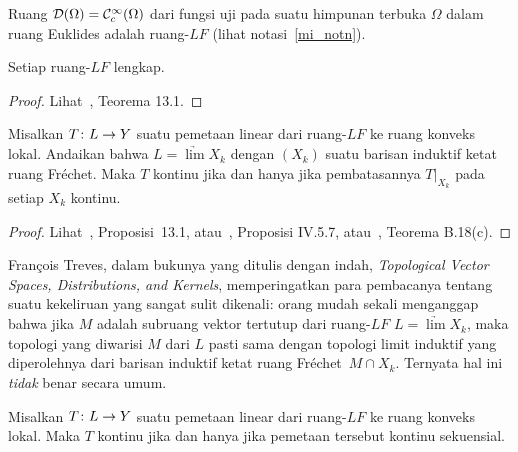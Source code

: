 \begin{exam} Ruang $\mathcal{D}(\Omega) = \mathcal{C}^\infty_c(\Omega)$ dari fungsi uji pada suatu himpunan terbuka $\Omega$ dalam ruang Euklides
adalah ruang-$LF$ (lihat notasi~\ref{mi_notn}).
\end{exam}

\begin{prop} Setiap ruang-$LF$ lengkap.
\end{prop}

\begin{proof} Lihat~\cite{Treves:1967}, Teorema 13.1.  \ns
\end{proof}

\begin{prop} Misalkan $T\colon L \rightarrow Y$ suatu pemetaan linear dari ruang-$LF$ ke ruang konveks lokal. Andaikan bahwa $L = \underrightarrow{\lim}X_k$
dengan $(X_k)$ suatu barisan induktif ketat ruang Fr\'echet. Maka $T$ kontinu jika dan hanya jika pembatasannya $T\bigr|_{X_k}$
pada setiap $X_k$ kontinu.
\end{prop}

\begin{proof} Lihat~\cite{Treves:1967}, Proposisi~13.1, atau~\cite{Conway:1990}, Proposisi IV.5.7, atau~\cite{Grubb:2009}, Teorema B.18(c).  \ns
\end{proof}

\begin{cau} Fran\c{c}ois Treves, dalam bukunya yang ditulis dengan indah, \emph{Topological Vector Spaces, Distributions, and Kernels}, memperingatkan
para pembacanya tentang suatu kekeliruan yang sangat sulit dikenali: orang mudah sekali menganggap bahwa jika $M$ adalah subruang vektor tertutup dari ruang-$LF$
$L = \underrightarrow{\lim}X_k$, maka topologi yang diwarisi $M$ dari $L$ pasti sama dengan topologi limit induktif yang diperolehnya
dari barisan induktif ketat ruang Fr\'echet~$M \cap X_k$. Ternyata hal ini \emph{tidak} benar secara umum.
\end{cau}

\begin{prop} Misalkan $T\colon L \rightarrow Y$ suatu pemetaan linear dari ruang-$LF$ ke ruang konveks lokal. Maka $T$ kontinu jika dan hanya jika
pemetaan tersebut kontinu sekuensial.
\end{prop}

















